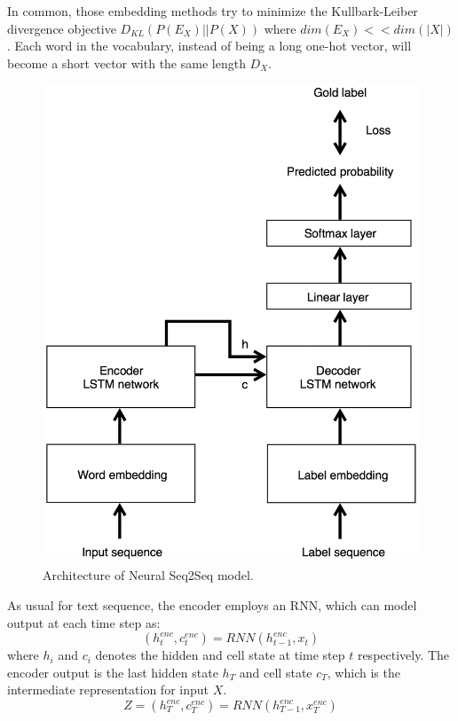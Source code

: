\documentclass[11pt,a4paper]{article}
\begin{document}
In common, those embedding methods try to minimize the Kullbark-Leiber divergence objective $D_{KL}(P(E_X) || P(X))$ where $dim(E_X) << dim(|X|)$. Each word in the vocabulary, instead of being a long one-hot vector, will become a short vector with the same length $D_X$. 


\begin{figure}[ht]
\centering
\includegraphics[width=0.7\linewidth]{fig_architecture}
\caption{Architecture of Neural Seq2Seq model.}
\label{fig:fig_architecture}
\end{figure}
As usual for text sequence, the encoder employs an RNN, which can model output at each time step as: 
  \begin{equation}
	({h^{enc}_t}, {c^{enc}_t}) = RNN(h^{enc}_{t-1}, x_t)
  \end{equation}
where $h_i$ and $c_i$ denotes the hidden and cell state at time step $t$ respectively. The encoder output is the last hidden state $h_T$ and cell state $c_T$, which is the intermediate representation for input $X$. 
  \begin{equation}
      {Z} = ({h^{enc}_T}, {c^{enc}_T}) = RNN(h^{enc}_{T-1}, x^{enc}_T)	
  \end{equation}
\end{document}
